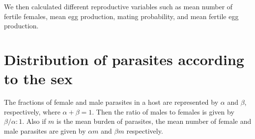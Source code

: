 \documentclass[12pt,a4paper]{article}
\theoremstyle{plain}%
\theoremstyle{definition}
\theoremstyle{remark}
\begin{document}
	
	We then calculated different reproductive variables such as mean number of fertile females, mean egg production, mating probability, and mean fertile egg production.
	
	
	
	
%	
		
	\section{Distribution of parasites according to the sex}\label{sec:distsexo}%
	The fractions of female and male parasites in a host are represented  by $\alpha$ and $\beta$, respectively, where $\alpha+\beta=1$.
	Then the ratio of males to females is given by $\beta / \alpha : 1$. Also if $m$ is the mean burden of parasites, the mean number of
	female and male parasites are given by $\alpha m$ and $\beta m $ respectively.
	
\end{document}
